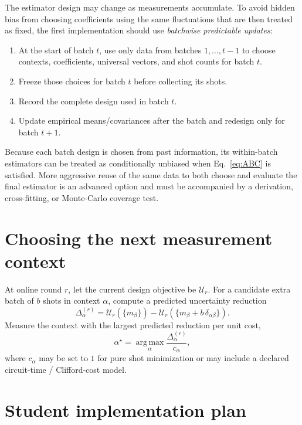 \documentclass[11pt]{article}
\newcommand{\argmax}{\operatorname*{arg\,max}}
\begin{document}
The estimator design may change as measurements accumulate.  To avoid hidden bias from choosing coefficients using the same fluctuations that are then treated as fixed, the first implementation should use \emph{batchwise predictable updates}:
\begin{enumerate}[label=\arabic*.]
  \item At the start of batch $t$, use only data from batches $1,\ldots,t-1$ to choose contexts, coefficients, universal vectors, and shot counts for batch $t$.
  \item Freeze those choices for batch $t$ before collecting its shots.
  \item Record the complete design used in batch $t$.
  \item Update empirical means/covariances after the batch and redesign only for batch $t+1$.
\end{enumerate}
Because each batch design is chosen from past information, its within-batch estimators can be treated as conditionally unbiased when Eq.~\eqref{eq:ABC} is satisfied.  More aggressive reuse of the same data to both choose and evaluate the final estimator is an advanced option and must be accompanied by a derivation, cross-fitting, or Monte-Carlo coverage test.

\section{Choosing the next measurement context}

At online round $r$, let the current design objective be $\mathcal U_r$.  For a candidate extra batch of $b$ shots in context $\alpha$, compute a predicted uncertainty reduction
\begin{equation}
  \Delta_\alpha^{(r)}
  =\mathcal U_r(\{m_\beta\})
  -\mathcal U_r(\{m_\beta+b\,\delta_{\alpha\beta}\}).
\end{equation}
Measure the context with the largest predicted reduction per unit cost,
\begin{equation}
  \alpha^\star
  =\argmax_\alpha
  \frac{\Delta_\alpha^{(r)}}{c_\alpha},
  \label{eq:context-choice}
\end{equation}
where $c_\alpha$ may be set to $1$ for pure shot minimization or may include a declared circuit-time / Clifford-cost model.

\section{Student implementation plan}
\end{document}
